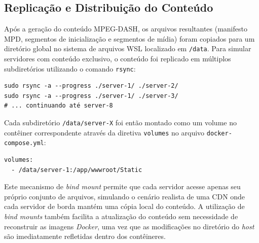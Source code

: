 \subsection{Replicação e Distribuição do Conteúdo}

Após a geração do conteúdo MPEG-DASH, os arquivos resultantes (manifesto MPD, segmentos de inicialização e segmentos de mídia) foram copiados para um diretório global no sistema de arquivos WSL localizado em \texttt{/data}. Para simular servidores com conteúdo exclusivo, o conteúdo foi replicado em múltiplos subdiretórios utilizando o comando \texttt{rsync}:

\begin{verbatim}
sudo rsync -a --progress ./server-1/ ./server-2/
sudo rsync -a --progress ./server-1/ ./server-3/
# ... continuando até server-8
\end{verbatim}

Cada subdiretório \texttt{/data/server-X} foi então montado como um volume no contêiner correspondente através da diretiva \texttt{volumes} no arquivo \texttt{docker-compose.yml}:

\begin{verbatim}
volumes:
  - /data/server-1:/app/wwwroot/Static
\end{verbatim}

Este mecanismo de \textit{bind mount} permite que cada servidor acesse apenas seu próprio conjunto de arquivos, simulando o cenário realista de uma CDN onde cada servidor de borda mantém uma cópia local do conteúdo. A utilização de \textit{bind mounts} também facilita a atualização do conteúdo sem necessidade de reconstruir as imagens \textit{Docker}, uma vez que as modificações no diretório do \textit{host} são imediatamente refletidas dentro dos contêineres.
